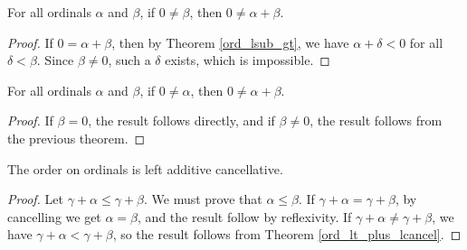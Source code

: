 \documentclass[../../math.tex]{subfiles}
\begin{document}
\begin{theorem} \label{ord_nz_rplus}
    For all ordinals $\alpha$ and $\beta$, if $0 \neq \beta$, then $0 \neq
    \alpha + \beta$.
\end{theorem}
\begin{proof}
    If $0 = \alpha + \beta$, then by Theorem \ref{ord_lsub_gt}, we have $\alpha
    + \delta < 0$ for all $\delta < \beta$.  Since $\beta \neq 0$, such a
    $\delta$ exists, which is impossible.
\end{proof}

\begin{theorem} \label{ord_nz_lplus}
    For all ordinals $\alpha$ and $\beta$, if $0 \neq \alpha$, then $0 \neq
    \alpha + \beta$.
\end{theorem}
\begin{proof}
    If $\beta = 0$, the result follows directly, and if $\beta \neq 0$, the
    result follows from the previous theorem.
\end{proof}

\begin{instance}
    The order on ordinals is left additive cancellative.
\end{instance}
\begin{proof}
    Let $\gamma + \alpha \leq \gamma + \beta$.  We must prove that $\alpha \leq
    \beta$.  If $\gamma + \alpha = \gamma + \beta$, by cancelling we get $\alpha
    = \beta$, and the result follow by reflexivity.  If $\gamma + \alpha \neq
    \gamma + \beta$, we have $\gamma + \alpha < \gamma + \beta$, so the result
    follows from Theorem \ref{ord_lt_plus_lcancel}.
\end{proof}
\end{document}
